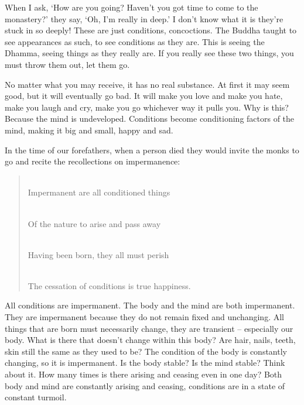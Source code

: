 When I ask, `How are you going? Haven't you got time to come to the monastery?' they say, `Oh, I'm really in deep.' I don't know what it is they're stuck in so deeply! These are just conditions, concoctions. The Buddha taught to see appearances as such, to see conditions as they are. This is seeing the Dhamma, seeing things as they really are. If you really see these two things, you must throw them out, let them go.

No matter what you may receive, it has no real substance. At first it may seem good, but it will eventually go bad. It will make you love and make you hate, make you laugh and cry, make you go whichever way it pulls you. Why is this? Because the mind is undeveloped. Conditions become conditioning factors of the mind, making it big and small, happy and sad.

In the time of our forefathers, when a person died they would invite the monks to go and recite the recollections on impermanence:

\begin{verse}
\\
Impermanent are all conditioned things

\\
Of the nature to arise and pass away

\\
Having been born, they all must perish

\\
The cessation of conditions is true happiness.
\end{verse}

All conditions are impermanent. The body and the mind are both impermanent. They are impermanent because they do not remain fixed and unchanging. All things that are born must necessarily change, they are transient -- especially our body. What is there that doesn't change within this body? Are hair, nails, teeth, skin still the same as they used to be? The condition of the body is constantly changing, so it is impermanent. Is the body stable? Is the mind stable? Think about it. How many times is there arising and ceasing even in one day? Both body and mind are constantly arising and ceasing, conditions are in a state of constant turmoil.

